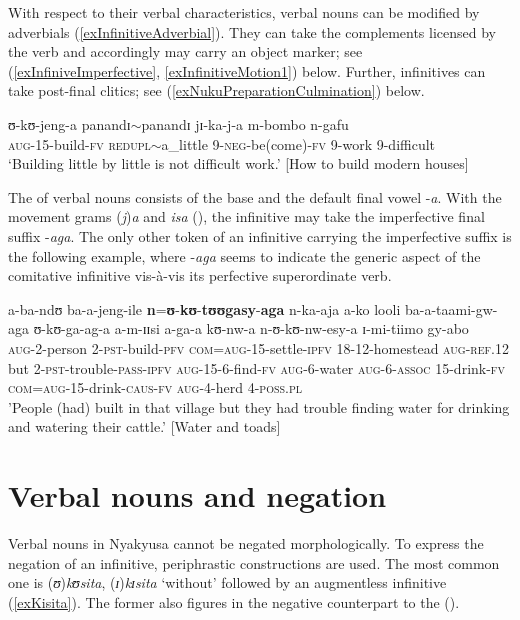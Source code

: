With respect to their verbal characteristics, verbal nouns can be modified by adverbials (\ref{exInfinitiveAdverbial}). They can take the complements licensed by the verb  and accordingly may carry an object marker; see (\ref{exInfiniveImperfective}, \ref{exInfinitiveMotion1}) below. Further, infinitives can take post-final clitics; see (\ref{exNukuPreparationCulmination}) below.

\begin{exe}
\ex \label{exInfinitiveAdverbial}\gll ʊ-kʊ-jeng-a panandɪ$\sim$panandɪ jɪ-ka-j-a m-bombo n-gafu\\
\textsc{aug}-15-build-\textsc{fv} \textsc{redupl}$\sim$a\_little 9-\textsc{neg}-be(come)-\textsc{fv} 9-work 9-difficult\\ 
\glt `Building little by little is not difficult work.' [How to build modern houses]
\end{exe}

The  of verbal nouns consists of the base and the default final vowel \mbox{-\textit{a}}. With the movement grams (\textit{j})\textit{a} and \textit{isa} (), the infinitive may take the imperfective final suffix \mbox{-\textit{aga}}. The only other token of an infinitive carrying the imperfective suffix is the following example, where -\textit{aga} seems to indicate the generic aspect of the comitative infinitive vis-à-vis its perfective superordinate verb.
\begin{exe}
\ex \label{exInfiniveImperfective} \gll a-ba-ndʊ ba-a-jeng-ile \textbf{n}=\textbf{ʊ}-\textbf{kʊ}-\textbf{tʊʊgasy}-\textbf{aga} n-ka-aja a-ko looli ba-a-taami-gw-aga ʊ-kʊ-ga-ag-a a-m-ɪɪsi a-ga-a kʊ-nw-a n-ʊ-kʊ-nw-esy-a ɪ-mi-tiimo gy-abo\\ 
\textsc{aug}-2-person 2-\textsc{pst}-build-\textsc{pfv} \textsc{com}=\textsc{aug}-15-settle-\textsc{ipfv} 18-12-homestead \textsc{aug}-\textsc{ref.12} but 2-\textsc{pst}-trouble-\textsc{pass}-\textsc{ipfv} \textsc{aug}-15-6-find-\textsc{fv} \textsc{aug}-6-water \textsc{aug}-6-\textsc{assoc} 15-drink-\textsc{fv} \textsc{com}=\textsc{aug}-15-drink-\textsc{caus}-\textsc{fv} \textsc{aug}-4-herd 4-\textsc{poss.pl}\\
\glt 'People (had) built in that village but they had trouble finding water for drinking and watering their cattle.' [Water and toads]
\end{exe}
\section{Verbal nouns and negation}\label{VerbalNounsNegation}
Verbal nouns in Nyakyusa cannot be negated morphologically. To express the negation of an infinitive, periphrastic constructions are used. The most common one is (\textit{ʊ})\textit{kʊsita}, (\textit{ɪ})\textit{kɪsita} `without' followed by an augmentless infinitive (\ref{exKisita}). The former also figures in the negative counterpart to the  ().

